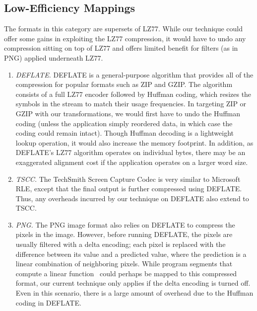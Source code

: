 \subsection*{Low-Efficiency Mappings}
\label{sec:formats-bad}

The formats in this category are supersets of LZ77.  While our
technique could offer some gains in exploiting the LZ77 compression,
it would have to undo any compression sitting on top of LZ77 and
offers limited benefit for filters (as in PNG) applied underneath
LZ77.

\begin{enumerate}

\item {\it DEFLATE.}  DEFLATE is a general-purpose algorithm that
  provides all of the compression for popular formats such as ZIP and
  GZIP.  The algorithm consists of a full LZ77 encoder followed by
  Huffman coding, which resizes the symbols in the stream to match
  their usage frequencies.  In targeting ZIP or GZIP with our
  transformations, we would first have to undo the Huffman coding
  (unless the application simply reordered data, in which case the
  coding could remain intact).  Though Huffman decoding is a
  lightweight lookup operation, it would also increase the memory
  footprint.  In addition, as DEFLATE's LZ77 algorithm operates on
  individual bytes, there may be an exaggerated alignment cost if the
  application operates on a larger word size.

\item {\it TSCC.}  The TechSmith Screen Capture Codec is very similar
  to Microsoft RLE, except that the final output is further compressed
  using DEFLATE.  Thus, any overheads incurred by our technique on
  DEFLATE also extend to TSCC.

\item {\it PNG.}  The PNG image format also relies on DEFLATE to
  compress the pixels in the image.  However, before running DEFLATE,
  the pixels are usually filtered with a delta encoding; each pixel is
  replaced with the difference between its value and a predicted
  value, where the prediction is a linear combination of neighboring
  pixels.  While program segments that compute a linear
  function~\cite{lamb-pldi03} could perhaps be mapped to this compressed
  format, our current technique only applies if the delta encoding is
  turned off.  Even in this scenario, there is a large amount of
  overhead due to the Huffman coding in DEFLATE.

\end{enumerate}

